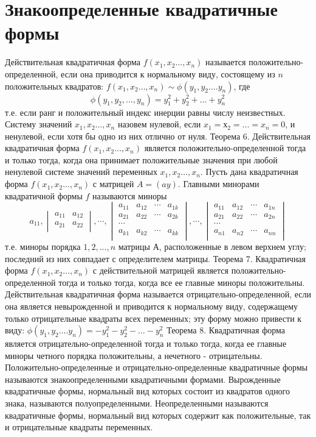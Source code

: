 \documentclass[bachelor, och, coursework, times]{SCWorks}
\newcommand\tab[1][1cm]{\hspace*{#1}}
\newcommand{\tl}{\newline\tab}
\begin{document}
\section{Знакоопределенные квадратичные формы}
\tab Действительная квадратичная форма $f(x_1,x_2…,x_n)$ называется положительно-определенной, если она приводится к нормальному виду, состоящему из $n$ положительных квадратов: $f(x_1,x_2…,x_n) \sim \phi(y_1,y_2….y_n)$, где \newline
$$\phi(y_1,y_2, … ,y_n)=y_1^2+y_2^2+…+y_n^2$$ т.е. если ранг и положительный индекс инерции равны числу неизвестных.
\tl
Систему значений $x_1,x_2…,x_n$ назовем нулевой, если $x_1 = х_2 = ... = x_n = 0$, и ненулевой, если хотя бы одно из них отлично от нуля.
\tl
Теорема 6. Действительная квадратичная форма $f(x_1,x_2…,x_n)$ является положительно-определенной тогда и только тогда, когда она принимает положительные значения при любой ненулевой системе значений переменных $x_1,x_2…,x_n$.
\tl Пусть дана квадратичная форма $f(x_1,x_2…,x_n)$ с матрицей $A = (ay)$. Главными минорами квадратичной формы $f$ называются миноры  
$$a_{11}, 
\begin{vmatrix}
a_{11} & a_{12} \\ 
a_{21} & a_{22} \\ 
\end{vmatrix},
\cdots
,
\begin{vmatrix}
a_{11} & a_{12} & \cdots & a_{1k} \\ 
a_{21} & a_{22} & \cdots & a_{2k} \\ 
\cdots \\
a_{k1} & a_{k2} & \cdots & a_{kk} \\ 
\end{vmatrix}
,
\cdots
,
\begin{vmatrix}
a_{11} & a_{12} & \cdots & a_{1n} \\ 
a_{21} & a_{22} & \cdots & a_{2n} \\ 
\cdots \\
a_{n1} & a_{n2} & \cdots & a_{nn} \\ 
\end{vmatrix}
$$
\tab т.е. миноры порядка $1, 2, ... , n$ матрицы $А$, расположенные в левом верхнем углу; последний из них совпадает с определителем матрицы.
\tl
Теорема 7. Квадратичная форма $f(x_1,x_2…,x_n)$ с действительной матрицей является положительно-определенной тогда и только тогда, когда все ее главные миноры положительны.
\tl
Действительная квадратичная форма называется отрицательно-определенной, если она является невырожденной и приводится к нормальному виду, содержащему только отрицательные квадраты всех переменных; эту форму можно привести к виду:
$\phi(y_1,y_2….y_n)= -y_{1}^2-y_{2}^2 -…- y_{n}^2$
\tl
Теорема 8. Квадратичная форма является отрицательно-определенной тогда и только тогда, когда ее главные миноры четного порядка положительны, а нечетного - отрицательны.
\tl
Положительно-определенные и отрицательно-определенные квадратичные формы называются знакоопределенными квадратичными формами.
\tl
Вырожденные квадратичные формы, нормальный вид которых состоит из квадратов одного знака, называются полуопределенными. Неопределенными называются квадратичные формы, нормальный вид которых содержит как положительные, так и отрицательные квадраты переменных.
\end{document}
